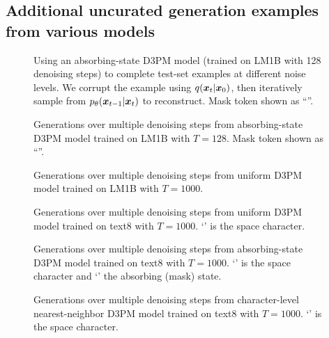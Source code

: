 \subsection{Additional uncurated generation examples from various models}

\begin{figure}
\centering

\caption{Using an absorbing-state D3PM model (trained on LM1B with 128 denoising steps) to complete test-set examples at different noise levels. We corrupt the example using $q(\boldsymbol{x}_t | \boldsymbol{x}_0)$, then iteratively sample from $p_\theta(\boldsymbol{x}_{t-1} | \boldsymbol{x}_t)$ to reconstruct. Mask token shown as ``\smallmasktok{}''.}
\end{figure}

\begin{figure}
\centering

\caption{Generations over multiple denoising steps from absorbing-state D3PM model trained on LM1B with $T=128$. Mask token shown as ``\smallmasktok{}''.}
\end{figure}

\begin{figure}
\centering

\caption{Generations over multiple denoising steps from uniform D3PM model trained on LM1B with $T=1000$.}
\end{figure}

\begin{figure}
\centering

\caption{Generations over multiple denoising steps from uniform D3PM model trained on text8 with $T=1000$. `\charspacetok{}' is the space character.}
\end{figure}

\begin{figure}
\centering

\caption{Generations over multiple denoising steps from absorbing-state D3PM model trained on text8 with $T=1000$. `\charspacetok{}' is the space character and `\charmasktok{}' the absorbing (mask) state.}
\end{figure}

\begin{figure}
\centering

\caption{Generations over multiple denoising steps from character-level nearest-neighbor D3PM model trained on text8 with $T=1000$. `\charspacetok{}' is the space character.}
\end{figure}
